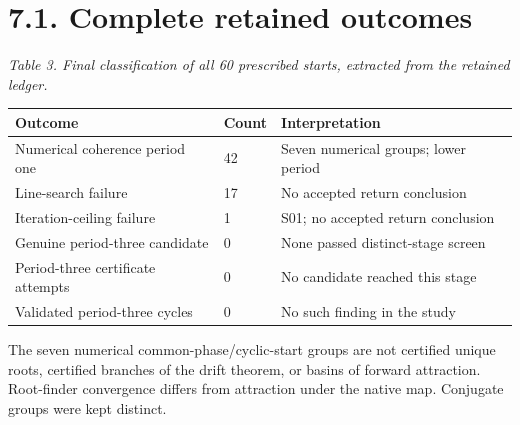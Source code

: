 \documentclass[11pt,a4paper]{article}
\begin{document}
\clearpage
\section*{7.1. Complete retained outcomes}
\par\textit{Table 3. Final classification of all 60 prescribed starts, extracted from the retained ledger.}\par
\begingroup\small
\begin{tabularx}{\textwidth}{XXX}
\toprule
Outcome & Count & Interpretation\\\midrule
Numerical coherence period one & 42 & Seven numerical groups; lower period\\
Line-search failure & 17 & No accepted return conclusion\\
Iteration-ceiling failure & 1 & S01; no accepted return conclusion\\
Genuine period-three candidate & 0 & None passed distinct-stage screen\\
Period-three certificate attempts & 0 & No candidate reached this stage\\
Validated period-three cycles & 0 & No such finding in the study\\
\bottomrule\end{tabularx}\endgroup\par
The seven numerical common-phase/cyclic-start groups are not certified unique roots, certified branches of the drift theorem, or basins of forward attraction. Root-finder convergence differs from attraction under the native map. Conjugate groups were kept distinct. \cite{D03}
\end{document}
